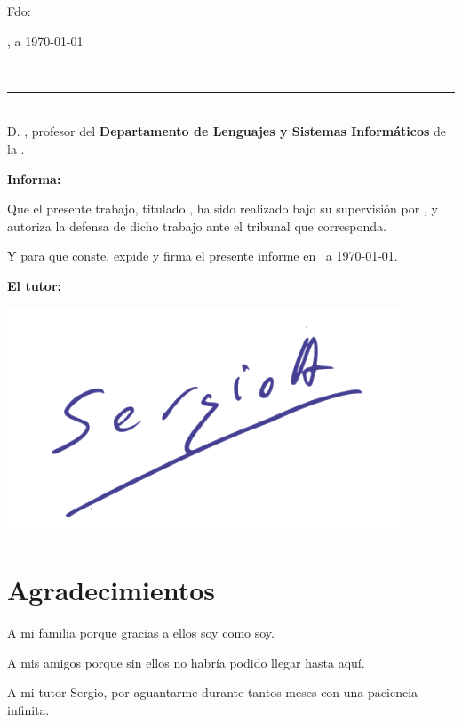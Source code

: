 \noindent Fdo: \autor


\vspace{2cm}

\begin{flushright}
\ciudad, a \today
\end{flushright}

\newpage
\thispagestyle{empty}
\
\vspace{3cm}

\noindent\rule[-1ex]{\textwidth}{2pt}\\[4.5ex]

D. \textbf{\tutor}, profesor del \textbf{Departamento de Lenguajes y Sistemas Informáticos} de la \textbf{\universidad}.

\vspace{0.5cm}

\vspace{0.5cm}

\textbf{Informa:}

\vspace{0.5cm}

Que el presente trabajo, titulado \textit{\textbf{\titulo}}, ha sido realizado bajo su supervisión por \textbf{\autor}, y 
autoriza la defensa de dicho trabajo ante el tribunal que corresponda.

\vspace{0.5cm}

Y para que conste, expide y firma el presente informe en \ciudad\ a \today.

\vspace{1cm}

\textbf{El tutor:}

\vspace{0.5cm}
\includegraphics[scale=0.3]{../images/firmaZerjillo3.png}
\vspace{3cm}

\noindent \textbf{\tutor}

\chapter*{Agradecimientos}
\thispagestyle{empty}

\vspace{1cm}

A mi familia porque gracias a ellos soy como soy.

\bigskip
A mis amigos porque sin ellos no habría podido llegar hasta aquí.

\bigskip
A mi tutor Sergio, por aguantarme durante tantos meses con una paciencia infinita.
